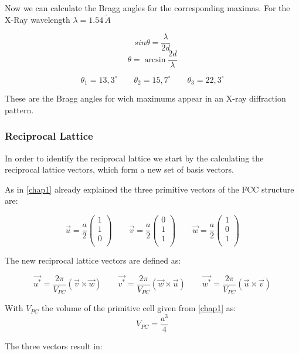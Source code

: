 Now we can calculate the Bragg angles for the corresponding maximas.
For the X-Ray wavelength $\lambda = 1.54 \, \mathring{A}$

$$
sin \theta = \frac{\lambda}{2d}
$$
$$
\theta = \arcsin{\frac{2d}{\lambda}}
$$

$$
\theta_1 = 13,3^\circ \qquad \theta_2 = 15,7^\circ \qquad \theta_3 = 22,3^\circ
$$

These are the Bragg angles for wich maximums appear in an X-ray diffraction pattern.


\subsubsection*{Reciprocal Lattice}
In order to identify the reciprocal lattice we start by the calculating
the reciprocal lattice vectors, which form a new set of basis vectors.

As in \autoref{chap1} already explained the three primitive vectors
of the FCC structure are:

$$\vec{u} = \frac{a}{2} \left(\begin{matrix}1\\1\\0\\\end{matrix}\right) \qquad
\vec{v} = \frac{a}{2} \left(\begin{matrix}0\\1\\1\\\end{matrix}\right) \qquad
\vec{w} = \frac{a}{2} \left(\begin{matrix}1\\0\\1\\\end{matrix}\right)$$

The new reciprocal lattice vectors are defined as:

\begin{equation}
    \vec{u^*} = \frac{2 \pi}{V_{PC}} (\vec{v} \times \vec{w}) \qquad
    \vec{v^*} = \frac{2 \pi}{V_{PC}} (\vec{w} \times \vec{u}) \qquad
    \vec{w^*} = \frac{2 \pi}{V_{PC}} (\vec{u} \times \vec{v})
\end{equation}

With $V_{PC}$ the volume of the primitive cell given from \autoref{chap1}
as:
$$V_{PC} = \frac{a^3}{4}$$

The three vectors result in:


